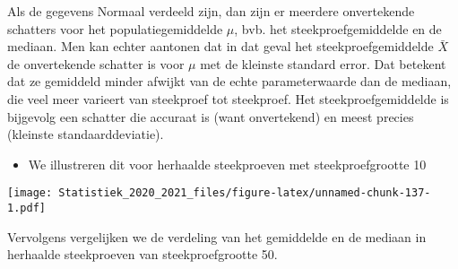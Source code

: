 \documentclass[
  12pt,dutch,coursenotes]{book}
\newenvironment{Shaded}{\begin{snugshade}}{\end{snugshade}}
\newcommand{\DataTypeTok}[1]{\textcolor[rgb]{0.13,0.29,0.53}{#1}}
\newcommand{\DecValTok}[1]{\textcolor[rgb]{0.00,0.00,0.81}{#1}}
\newcommand{\KeywordTok}[1]{\textcolor[rgb]{0.13,0.29,0.53}{\textbf{#1}}}
\newcommand{\NormalTok}[1]{#1}
\newcommand{\OperatorTok}[1]{\textcolor[rgb]{0.81,0.36,0.00}{\textbf{#1}}}
\newcommand{\StringTok}[1]{\textcolor[rgb]{0.31,0.60,0.02}{#1}}
\providecommand{\tightlist}{%
  \setlength{\itemsep}{0pt}\setlength{\parskip}{0pt}}
\theoremstyle{definition}
\theoremstyle{definition}
\theoremstyle{definition}
\theoremstyle{remark}
\begin{document}
Als de gegevens Normaal verdeeld zijn, dan zijn er meerdere onvertekende
schatters voor het populatiegemiddelde \(\mu\), bvb. het steekproefgemiddelde en
de mediaan. Men kan echter aantonen dat in dat geval het
steekproefgemiddelde \(\bar{X}\) de onvertekende schatter is voor \(\mu\) met de
kleinste standard error. Dat betekent dat ze gemiddeld minder afwijkt van
de echte parameterwaarde dan de mediaan, die veel meer
varieert van steekproef tot steekproef. Het steekproefgemiddelde is
bijgevolg een schatter die accuraat is (want onvertekend) en meest precies
(kleinste standaarddeviatie).

\begin{itemize}
\tightlist
\item
  We illustreren dit voor herhaalde steekproeven met steekproefgrootte 10
\end{itemize}

\begin{Shaded}
\end{Shaded}

\texttt{[image: Statistiek\_2020\_2021\_files/figure-latex/unnamed-chunk-137-1.pdf]}

Vervolgens vergelijken we de verdeling van het gemiddelde en de mediaan in herhaalde steekproeven van steekproefgrootte 50.
\end{document}
